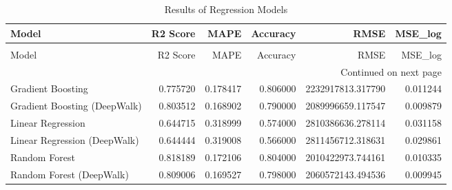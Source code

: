 \begin{longtable}{lrrrrr}
\caption{Results of Regression Models} \label{tab:regression_results} \\
\toprule
Model & R2 Score & MAPE & Accuracy & RMSE & MSE_log \\
\midrule
\endfirsthead
\caption[]{Results of Regression Models} \\
\toprule
Model & R2 Score & MAPE & Accuracy & RMSE & MSE_log \\
\midrule
\endhead
\midrule
\multicolumn{6}{r}{Continued on next page} \\
\midrule
\endfoot
\bottomrule
\endlastfoot
Gradient Boosting & 0.775720 & 0.178417 & 0.806000 & 2232917813.317790 & 0.011244 \\
Gradient Boosting (DeepWalk) & 0.803512 & 0.168902 & 0.790000 & 2089996659.117547 & 0.009879 \\
Linear Regression & 0.644715 & 0.318999 & 0.574000 & 2810386636.278114 & 0.031158 \\
Linear Regression (DeepWalk) & 0.644444 & 0.319008 & 0.566000 & 2811456712.318631 & 0.029861 \\
Random Forest & 0.818189 & 0.172106 & 0.804000 & 2010422973.744161 & 0.010335 \\
Random Forest (DeepWalk) & 0.809006 & 0.169527 & 0.798000 & 2060572143.494536 & 0.009945 \\
\end{longtable}
